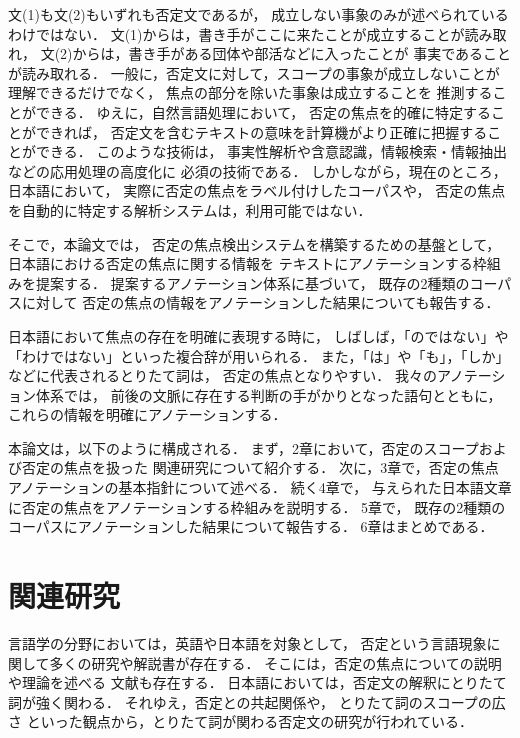 \documentclass[japanese]{jnlp_1.4}
\begin{document}
文(1)も文(2)もいずれも否定文であるが，
成立しない事象のみが述べられているわけではない．
文(1)からは，書き手がここに来たことが成立することが読み取れ，
文(2)からは，書き手がある団体や部活などに入ったことが
事実であることが読み取れる．
一般に，否定文に対して，スコープの事象が成立しないことが理解できるだけでなく，
焦点の部分を除いた事象は成立することを
推測することができる\cite{neg2007,EduardoMoldo2011b}．
ゆえに，自然言語処理において，
否定の焦点を的確に特定することができれば，
否定文を含むテキストの意味を計算機がより正確に把握することができる．
このような技術は，
事実性解析や含意認識，情報検索・情報抽出などの応用処理の高度化に
必須の技術である．
しかしながら，現在のところ，日本語において，
実際に否定の焦点をラベル付けしたコーパスや，
否定の焦点を自動的に特定する解析システムは，利用可能ではない．

そこで，本論文では，
否定の焦点検出システムを構築するための基盤として，
日本語における否定の焦点に関する情報を
テキストにアノテーションする枠組みを提案する．
提案するアノテーション体系に基づいて，
既存の2種類のコーパスに対して
否定の焦点の情報をアノテーションした結果についても報告する．

日本語において焦点の存在を明確に表現する時に，
しばしば，「のではない」や「わけではない」といった複合辞が用いられる．
また，「は」や「も」，「しか」などに代表されるとりたて詞\cite{toritate2009}は，
否定の焦点となりやすい．
我々のアノテーション体系では，
前後の文脈に存在する判断の手がかりとなった語句とともに，
これらの情報を明確にアノテーションする．

本論文は，以下のように構成される．
まず，2章において，否定のスコープおよび否定の焦点を扱った
関連研究について紹介する．
次に，3章で，否定の焦点アノテーションの基本指針について述べる．
続く4章で，
与えられた日本語文章に否定の焦点をアノテーションする枠組みを説明する．
5章で，
既存の2種類のコーパスにアノテーションした結果について報告する．
6章はまとめである．


\section{関連研究}
\label{sec:related}

言語学の分野においては，英語や日本語を対象として，
否定という言語現象に関して多くの研究や解説書が存在する．
そこには，否定の焦点についての説明や理論を述べる
文献\cite{Cambridge,kato2010,neg2007}も存在する．
日本語においては，否定文の解釈にとりたて詞が強く関わる．
それゆえ，否定との共起関係\cite{neg2007,toritate2009}や，
とりたて詞のスコープの広さ\cite{Numata1986,Mogi1999,Numata2009,Kobayashi2009}
といった観点から，とりたて詞が関わる否定文の研究が行われている．
\end{document}
